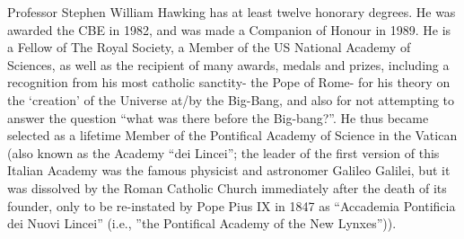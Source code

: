\documentclass[12pt]{article}
\theoremstyle{plain}
\theoremstyle{definition}
\numberwithin{equation}{section}
\begin{document}
 Professor Stephen William Hawking has at least twelve honorary degrees. He was awarded the CBE in 1982, and was made a Companion of Honour in 1989. He is a Fellow of The Royal Society, a Member of the US National Academy of Sciences,
as well as the recipient of many awards, medals and prizes, including a recognition from his most catholic
sanctity- the Pope of Rome- for his theory on the `creation' of the Universe at/by the Big-Bang, and also for not attempting to answer the question ``what was there before the Big-bang?''. He thus became selected as a lifetime Member of the Pontifical Academy of Science in the Vatican (also known as the Academy ``dei Lincei''; the leader of the first version of this Italian Academy was the famous physicist and astronomer Galileo Galilei, but it was dissolved by the Roman Catholic Church immediately after the death of its founder, only to be re-instated by Pope Pius IX in 1847 as ``Accademia Pontificia dei Nuovi Lincei'' (i.e., ''the Pontifical Academy of the New Lynxes'')).


\end{document}
